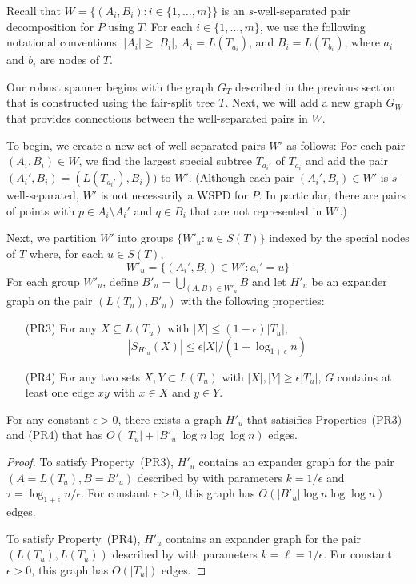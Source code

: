 \documentclass{patmorin}
\begin{document}
Recall that $W=\{(A_i,B_i):i\in\{1,\ldots,m\}\}$ is an $s$-well-separated
pair decomposition for $P$ using $T$. For each $i\in\{1,\ldots,m\}$,
we use the following notational conventions:  $|A_i|\ge |B_i|$,
$A_i=L(T_{a_i})$, and $B_i=L(T_{b_i})$, where $a_i$ and $b_i$ are nodes
of $T$.

Our robust spanner begins with the graph $G_T$ described in the
previous section that is constructed using the fair-split tree $T$.
Next, we will add a new graph $G_W$ that provides connections between
the well-separated pairs in $W$.

To begin, we create a new set of well-separated pairs $W'$ as follows:
For each pair $(A_i,B_i)\in W$, we find the largest special subtree
$T_{a_i'}$ of $T_{a_i}$ and add the pair $(A_i',B_i)=(L(T_{a_i'}),B_i))$
to $W'$.  (Although each pair $(A_i',B_i)\in W'$ is $s$-well-separated,
$W'$ is not necessarily a WSPD for $P$.  In particular, there are pairs
of points with $p\in A_i\setminus A_i'$ and $q\in B_i$ that
are not represented in $W'$.)

Next, we partition $W'$ into groups $\{W'_u: u\in S(T)\}$ indexed by
the special nodes of $T$ where, for each $u\in S(T)$,
\[
	W'_u = \{ (A_i',B_i)\in W' : a_i' = u \}
\]
For each group $W'_u$, define $B'_u=\bigcup_{(A,B)\in W'_u} B$
and let $H'_u$ be an expander graph on the pair $(L(T_u), B'_u)$ with
the following properties:
\begin{enumerate}
  \item[(PR3)] For any $X\subseteq L(T_u)$ with $|X|\le
  (1-\epsilon)|T_u|$, 
   \[ |S_{H'_u}(X)| \le \epsilon|X|/(1+\log_{1+\epsilon} n) \]
%
  \item[(PR4)] For any two sets $X,Y\subset L(T_u)$ with $|X|,|Y|\ge
  \epsilon|T_u|$, $G$ contains at least one edge $xy$ with $x\in X$
  and $y\in Y$.
\end{enumerate}

\begin{clm}
  For any constant $\epsilon >0$, there exists a graph $H'_u$ that
  satisifies Properties~(PR3) and (PR4) that has $O(|T_u|+|B'_u|\log
  n\log\log n)$ edges.
\end{clm}

\begin{proof}
  To satisfy Property~(PR3), $H'_u$ contains an expander graph for the
  pair $(A=L(T_u),B=B'_u)$ described by  with parameters
  $k=1/\epsilon$ and $\tau=\log_{1+\epsilon} n/\epsilon$.  For constant
  $\epsilon >0$, this graph has $O(|B'_u|\log n\log\log n)$ edges.

  To satisfy Property~(PR4), $H'_u$ contains an expander graph for the
  pair $(L(T_u),L(T_u))$ described by  with parameters
  $k=\ell=1/\epsilon$.  For constant $\epsilon >0$, this graph has 
  $O(|T_u|)$ edges.
\end{proof}
\end{document}
